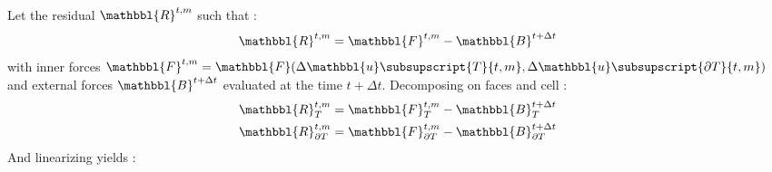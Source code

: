         Let the residual $\mathbbl{R}^{t,m}$ such that :
        \begin{equation}
            \mathbbl{R}^{t,m}
            =
            \mathbbl{F}^{t,m}
            -
            \mathbbl{B}^{t+\Delta t}
        \end{equation}
        with inner forces $\mathbbl{F}^{t,m} = \mathbbl{F}(\Delta\mathbbl{u}\subsupscript{{T}}{t,m}, \Delta\mathbbl{u}\subsupscript{{\partial T}}{t,m})$ and external forces $\mathbbl{B}^{t+\Delta t}$ evaluated at the time $t+\Delta t$.
        Decomposing on faces and cell :
        \begin{equation}
            \begin{aligned}
                & \mathbbl{R}_{T}^{t,m}
                =
                \mathbbl{F}_{T}^{t,m}
                -
                \mathbbl{B}_{T}^{t+\Delta t}
                \\
                & \mathbbl{R}_{\partial T}^{t,m}
                =
                \mathbbl{F}_{\partial T}^{t,m}
                -
                \mathbbl{B}_{\partial T}^{t+\Delta t}
            \end{aligned}
        \end{equation}
        And linearizing yields :

